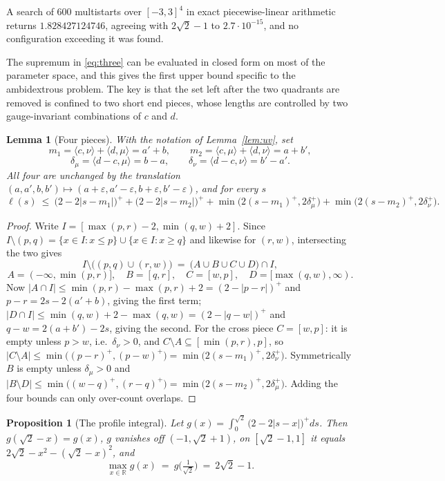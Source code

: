 \documentclass[11pt]{article}
\newtheorem{lemma}[theorem]{Lemma}
\newtheorem{proposition}[theorem]{Proposition}
\theoremstyle{definition}
\newcommand{\R}{\mathbb{R}}
\newcommand{\dmu}{\delta_\mu}
\newcommand{\dnu}{\delta_\nu}
\begin{document}
A search of $600$ multistarts over $[-3,3]^4$ in exact piecewise-linear arithmetic returns
$1.828427124746$, agreeing with $2\sqrt2-1$ to $2.7\cdot10^{-15}$, and no configuration
exceeding it was found.

The supremum in \eqref{eq:three} can be evaluated in closed form on most of the parameter
space, and this gives the first upper bound specific to the ambidextrous problem. The key
is that the set left after the two quadrants are removed is confined to two short end
pieces, whose lengths are controlled by two gauge-invariant combinations of $c$ and $d$.

\begin{lemma}[Four pieces]\label{lem:fourpiece}
With the notation of Lemma~\ref{lem:uv}, set
\[
  m_1=\langle c,\nu\rangle+\langle d,\mu\rangle=a'+b,\qquad
  m_2=\langle c,\mu\rangle+\langle d,\nu\rangle=a+b',
\]
\[
  \dmu=\langle d-c,\mu\rangle=b-a,\qquad \dnu=\langle d-c,\nu\rangle=b'-a' .
\]
All four are unchanged by the translation
$(a,a',b,b')\mapsto(a+\varepsilon,a'-\varepsilon,b+\varepsilon,b'-\varepsilon)$, and for every $s$
\begin{equation}\label{eq:fourpiece}
  \ell(s)\ \le\ \bigl(2-2|s-m_1|\bigr)^+ +\bigl(2-2|s-m_2|\bigr)^+
            +\min\bigl(2(s-m_1)^+,2\dmu^+\bigr)+\min\bigl(2(s-m_2)^+,2\dnu^+\bigr).
\end{equation}
\end{lemma}

\begin{proof}
Write $I=[\max(p,r)-2,\min(q,w)+2]$. Since $I\setminus(p,q)=\{x\in I:x\le p\}\cup\{x\in
I:x\ge q\}$ and likewise for $(r,w)$, intersecting the two gives
\[
  I\setminus\bigl((p,q)\cup(r,w)\bigr)\ =\ \bigl(A\cup B\cup C\cup D\bigr)\cap I,
\]
\[
  A=(-\infty,\min(p,r)],\quad B=[q,r],\quad C=[w,p],\quad D=[\max(q,w),\infty).
\]
Now $|A\cap I|\le\min(p,r)-\max(p,r)+2=(2-|p-r|)^+$ and $p-r=2s-2(a'+b)$, giving the first
term; $|D\cap I|\le\min(q,w)+2-\max(q,w)=(2-|q-w|)^+$ and $q-w=2(a+b')-2s$, giving the
second. For the cross piece $C=[w,p]$: it is empty unless $p>w$, i.e.\ $\dnu>0$, and
$C\setminus A\subseteq[\min(p,r),p]$, so $|C\setminus A|\le\min\bigl((p-r)^+,(p-w)^+\bigr)
=\min\bigl(2(s-m_1)^+,2\dnu^+\bigr)$. Symmetrically $B$ is empty unless $\dmu>0$ and
$|B\setminus D|\le\min\bigl((w-q)^+,(r-q)^+\bigr)=\min\bigl(2(s-m_2)^+,2\dmu^+\bigr)$.
Adding the four bounds can only over-count overlaps.
\end{proof}

\begin{proposition}[The profile integral]\label{prop:gfun}
Let $g(x)=\int_0^{\sqrt2}\bigl(2-2|s-x|\bigr)^+ds$. Then $g(\sqrt2-x)=g(x)$, $g$ vanishes
off $(-1,\sqrt2+1)$, on $[\sqrt2-1,1]$ it equals $2\sqrt2-x^2-(\sqrt2-x)^2$, and
\[
  \max_{x\in\R}g(x)\ =\ g\bigl(\tfrac1{\sqrt2}\bigr)\ =\ 2\sqrt2-1 .
\]
\end{proposition}
\end{document}

